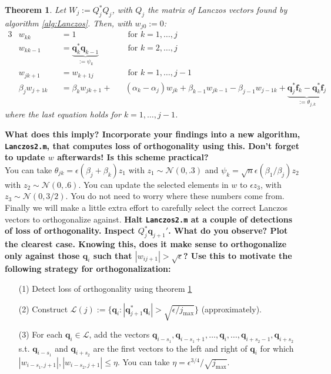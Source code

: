 \documentclass[12pt]{article}
\newtheorem{theorem}{Theorem}
\begin{document}
\begin{theorem}\label{thm:recurrence}
Let $W_j:=Q_j^{\ast}Q_j$, with $Q_j$ the matrix of Lanczos vectors found by algorithm \ref{alg:Lanczos}. Then, with $w_{j0}:=0$:
\begin{alignat*}{3}
&w_{kk}&&=1&& \text{ for }k=1,\ldots,j\\
&w_{kk-1}&&=\underbrace{\mathbf{q}_k^{\ast}\mathbf{q}_{k-1}}_{:=\psi_k} && \text{ for } k=2,\ldots,j\\
&w_{jk+1}&&=w_{k+1j}&& \text{ for } k=1,\ldots,j-1\\
&\beta_{j}w_{j+1k}&&=\beta_{k}w_{jk+1}+&&(\alpha_k-\alpha_j)w_{jk}+\beta_{k-1}w_{jk-1}-\beta_{j-1}w_{j-1k}+\underbrace{\mathbf{q}_{j}^{\ast}\mathbf{f}_k-\mathbf{q}_{k}^{\ast}\mathbf{f}_j}_{:=\theta_{j,k}}
\end{alignat*}
where the last equation holds for $k=1,\ldots,j-1$.
\end{theorem}
\textbf{What does this imply? Incorporate your findings into a new algorithm, \texttt{Lanczos2.m}, that computes loss of orthogonality using this. Don't forget to update $w$ afterwards! Is this scheme practical?}\\
You can take $\theta_{jk}=\epsilon(\beta_{j}+\beta_{k})z_1$ with $z_1\sim \mathcal{N}(0,.3)$ and $\psi_{k}=\sqrt{n}\epsilon(\beta_{1}/\beta_{j}) z_2$ with $z_2\sim \mathcal{N}(0,.6)$. You can update the selected elements in $w$ to $\epsilon z_3$, with $z_3\sim\mathcal{N}(0,3/2)$. You do not need to worry where these numbers come from.\\
Finally we will make a little extra effort to carefully select the correct Lanczos vectors to orthogonalize against. \textbf{Halt \texttt{Lanczos2.m} at a couple of detections of loss of orthogonality. Inspect $Q_j^{\ast}\mathbf{q}_{j+1}'$. What do you observe? Plot the clearest case. Knowing this, does it make sense to orthogonalize only against those $\mathbf{q}_i$ such that $|w_{ij+1}|>\sqrt{\epsilon}$? Use this to motivate the following strategy for orthogonalization:}
\begin{itemize}
\item[(1)] Detect loss of orthogonality using theorem \ref{thm:recurrence}
\item[(2)] Construct $\mathcal{L}(j):=\{\mathbf{q}_i:|\mathbf{q}_{j+1}^{\ast}\mathbf{q}_{i}|>\sqrt{\epsilon/j_{\text{max}}}\}$ (approximately).
\item[(3)] For each $\mathbf{q}_i\in\mathcal{L}$, add the vectors $\mathbf{q}_{i-s_1},\mathbf{q}_{i-s_1+1},\ldots,\mathbf{q}_{i},\ldots,\mathbf{q}_{i+s_2-1},\mathbf{q}_{i+s_2}$ s.t. $\mathbf{q}_{i-s_1}$ and $\mathbf{q}_{i+s_2}$ are the first vectors to the left and right of $\mathbf{q}_{i}$ for which $|w_{i-s_1,j+1}|,|w_{i-s_2,j+1}|\leq\eta$. You can take $\eta=\epsilon^{3/4}/\sqrt{j_{\text{max}}}$. 
\end{itemize}
\end{document}
